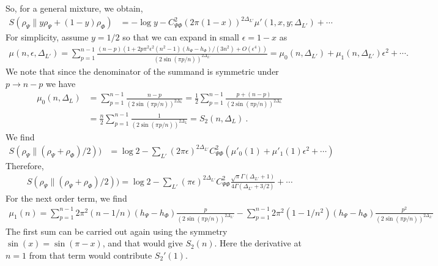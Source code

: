\documentclass[11pt]{article}
\newcommand{\ep}{\epsilon}
\newcommand{\nn}{\nonumber}
\newcommand{\lb}{\left(}
\newcommand{\rb}{\right)}
\begin{document}
So, for a general mixture, we obtain,
\begin{align}
    S(\rho_\Psi \| y\rho_\Psi + (1-y)\rho_\Phi) &= -\log y - C_{\Psi\Phi}^2 \lb 2\pi (1-x) \rb^{2\Delta_{L'}} \mu'(1,x,y;\Delta_{L'}) + \cdots
\end{align}
For simplicity, assume $y=1/2$ so that we can expand in small $\ep=1-x$ as
\begin{align}
  \mu(n,\ep,\Delta_{L'})=\sum_{p=1}^{n-1}\frac{(n-p)(1+2p\pi^2\ep^2(n^2-1)(h_\Psi - h_\Phi)/(3n^2)+O(\ep^4))}{(2\sin(\pi p/n))^{2\Delta_{L'}}}=\mu_0(n,\Delta_{L'})+\mu_1(n,\Delta_{L'})\ep^2+\cdots.
\end{align}
We note that since the denominator of the summand is symmetric under $p\to n-p$ we have
\begin{align}
  \mu_0(n,\Delta_{L})&=\sum_{p=1}^{n-1}\frac{n-p}{(2\sin(\pi p/n))^{2\Delta_L}}=\frac{1}{2}\sum_{p=1}^{n-1}\frac{p+(n-p)}{(2\sin(\pi p/n))^{2\Delta_L}}\nn\\
  &=\frac{n}{2}\sum_{p=1}^{n-1}\frac{1}{(2\sin(\pi p/n))^{2\Delta_L}}=S_2(n,\Delta_{L})\ .
\end{align}
We find
\begin{align}
 S(\rho_\Psi\|(\rho_\Psi+\rho_\Phi)/2))&=\log 2-\sum_{L'}(2\pi \ep)^{2\Delta_{L'}}  C_{\Psi \Phi}^2(\mu'_0(1)+\mu'_1(1)\ep^2+\cdots)
\end{align} 
Therefore,
\begin{align}
    \boxed{S(\rho_\Psi\|(\rho_\Psi+\rho_\Phi)/2))=\log 2-\sum_{L'}(\pi \ep)^{2\Delta_{L'}} C_{\Psi \Phi}^2 \frac{\sqrt{\pi}\Gamma(\Delta_{L'}+1)}{4\Gamma(\Delta_{L'}+3/2)} +\cdots}
\end{align}
For the next order term, we find
\begin{align}
    \mu_1(n) = \sum_{p=1}^{n-1}2\pi^2 \lb n-1/n\rb  (h_\Psi - h_\Phi) \frac{p}{(2\sin(\pi p/n))^{2\Delta_{L'}}} - \sum_{p=1}^{n-1}2\pi^2 (1-1/n^2) (h_\Psi- h_\Phi) \frac{p^2}{(2\sin(\pi p/n))^{2\Delta_{L'}}} 
\end{align}
The first sum can be carried out again using the symmetry $\sin(x) = \sin (\pi - x)$, and that would give $S_2(n)$. Here the derivative at $n=1$ from that term would contribute $S_2'(1)$.
\end{document}
